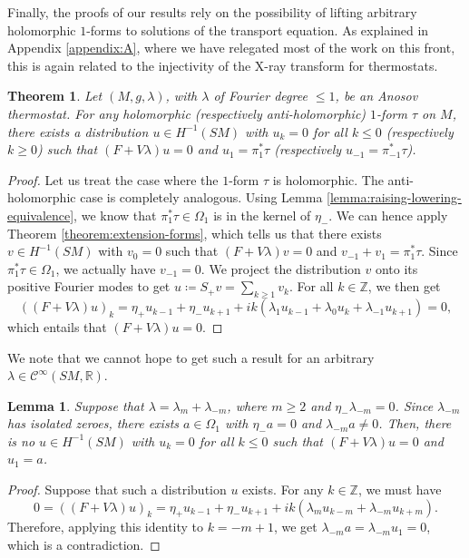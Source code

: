 \documentclass[reqno,12pt,letterpaper]{amsart}
\newtheorem{theorem}[proposition]{Theorem}
\newtheorem{lemma}[proposition]{Lemma}
\theoremstyle{definition}
\theoremstyle{remark}
\theoremstyle{definition}
\numberwithin{equation}{section}
\newcommand{\R}{\mathbb{R}}
\newcommand{\Z}{\mathbb{Z}}
\begin{document}
Finally, the proofs of our results rely on the possibility of lifting arbitrary holomorphic $1$-forms to solutions of the transport equation. As explained in Appendix \ref{appendix:A}, where we have relegated most of the work on this front, this is again related to the injectivity of the X-ray transform for thermostats. 

\begin{theorem}\label{theorem:extension-holomorphic}
Let $(M, g, \lambda)$, with $\lambda$ of Fourier degree $\leq 1$, be an Anosov thermostat. For any holomorphic (respectively anti-holomorphic) $1$-form $\tau$ on $M$, there exists a distribution $u\in H^{-1}(SM)$ with $u_k=0$ for all $k\leq 0$ (respectively $k\geq 0$) such that $(F+V\lambda)u=0$ and $u_1 = \pi_1^*\tau$ (respectively $u_{-1}=\pi_{-1}^*\tau$). 
\end{theorem}
\begin{proof}
Let us treat the case where the $1$-form $\tau$ is holomorphic. The anti-holomorphic case is completely analogous. Using Lemma \ref{lemma:raising-lowering-equivalence}, we know that $\pi_1^*\tau \in \Omega_1$ is in the kernel of $\eta_-$. We can hence apply Theorem \ref{theorem:extension-forms}, which tells us that there exists $v\in H^{-1}(SM)$ with $v_0=0$ such that $(F+V\lambda)v=0$ and $v_{-1}+v_1= \pi_1^*\tau$. Since $\pi_1^*\tau \in \Omega_1$, we actually have $v_{-1}=0$. We project the distribution $v$ onto its positive Fourier modes to get $u\coloneqq S_+ v=\sum_{k\geq 1}v_k$. 
For all $k\in \Z$, we then get
$$((F+V\lambda)u)_k=\eta_+u_{k-1}+\eta_-u_{k+1}+ik(\lambda_1 u_{k-1}+\lambda_0 u_k+\lambda_{-1}u_{k+1})=0,$$
which entails that $(F+V\lambda)u=0$. 
\end{proof}

We note that we cannot hope to get such a result for an arbitrary $\lambda\in \mathcal{C}^\infty(SM, \R)$. 

\begin{lemma}\label{lemma:no-go-lemma}
Suppose that $\lambda=\lambda_m+\lambda_{-m}$, where $m\geq 2$ and $\eta_- \lambda_{-m}=0$. Since $\lambda_{-m}$ has isolated zeroes, there exists $a\in \Omega_1$ with $\eta_- a = 0$ and $\lambda_{-m}a\neq 0$. Then, there is no $u\in H^{-1}(SM)$ with $u_k=0$ for all $k\leq 0$ such that $(F+V\lambda)u=0$ and $u_1 = a$. 
\end{lemma}
\begin{proof}
Suppose that such a distribution $u$ exists. For any $k\in \Z$, we must have 
$$0=((F+V\lambda)u)_k = \eta_+ u_{k-1}+\eta_-u_{k+1}+ik(\lambda_m u_{k-m}+\lambda_{-m}u_{k+m}).$$
Therefore, applying this identity to $k=-m+1$, we get $\lambda_{-m}a=\lambda_{-m}u_1=0$, which is a contradiction.%
\end{proof}
\end{document}
